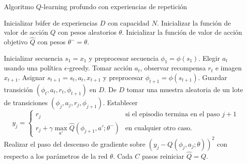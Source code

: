\begin{mialgoritmo}[H]
  	\caption{Algoritmo $Q$-learning profundo con experiencias de repetición}
	\label{alg:dqn-algo}
  \begin{algorithmic}[1]
  \STATE Inicializar búfer de experiencias $D$ con capacidad $N$.
  \STATE Inicializar la función de valor de acción $Q$ con pesos aleatorios $\theta$.
  \STATE Inicializar la función de valor de acción objetivo $\hat{Q}$ con pesos $\theta^- = \theta$.
  
    \STATE Inicializar secuencia $s_1 = {x_1}$ y preprocesar secuencia $\phi_1 = \phi(s_1)$.
    \STATE Elegir $a_t$ usando una política $\epsilon$-greedy.
    \STATE Tomar acción $a_t$, observar recompensa $r_{t}$ e imagen $x_{t+1}$.
    \STATE Asignar $s_{t+1} =  s_t, a_t, x_{t+1}$ y preprocesar $\phi_{t+1} = \phi(s_{t+1})$.
    \STATE Guardar transición $(\phi_t, a_t, r_t, \phi_{t+1})$ en $D$.
    \STATE De $D$ tomar una muestra aleatoria de un lote de transiciones $(\phi_j, a_j, r_j, \phi_{j+1})$.
    \STATE Establecer
	\[
	 y_j = 
   \begin{cases} 
      r_j  & \mbox{si el episodio termina en el paso } j + 1 \\
      r_j + \gamma \max_{a'}\hat{Q}(\phi_{j+1}, a'; \theta^-) & \mbox{en cualquier otro caso.}
   \end{cases}
	\]
	\STATE Realizar el paso del
	descenso de gradiente sobre $(y_j -  Q(\phi_j,a_j;\theta))^2$ con respecto a los parámetros de la red $\theta$.
	\STATE Cada $C$ pasos reiniciar $\hat{Q} = Q$.
    \ENDFOR
  \ENDFOR
  \end{algorithmic}
\end{mialgoritmo}

	
	
